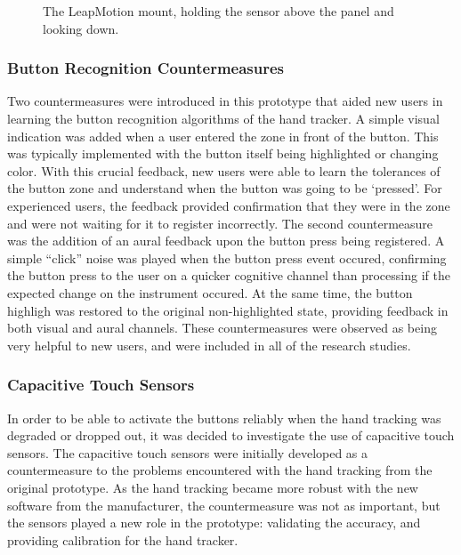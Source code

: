 \begin{figure}
    \centering
    \caption{The LeapMotion mount, holding the sensor above the panel and looking down.}
    \label{fig:proto_leap_mount}
\end{figure}

\subsubsection{Button Recognition Countermeasures}

Two countermeasures were introduced in this prototype that aided new users in learning the button recognition algorithms of the hand tracker.
A simple visual indication was added when a user entered the zone in front of the button.
This was typically implemented with the button itself being highlighted or changing color.
With this crucial feedback, new users were able to learn the tolerances of the button zone and understand when the button was going to be `pressed'.
For experienced users, the feedback provided confirmation that they were in the zone and were not waiting for it to register incorrectly.
The second countermeasure was the addition of an aural feedback upon the button press being registered.
A simple ``click'' noise was played when the button press event occured, confirming the button press to the user on a quicker cognitive channel than processing if the expected change on the instrument occured.
At the same time, the button highligh was restored to the original non-highlighted state, providing feedback in both visual and aural channels.
These countermeasures were observed as being very helpful to new users, and were included in all of the research studies.

\subsubsection{Capacitive Touch Sensors}

In order to be able to activate the buttons reliably when the hand tracking was degraded or dropped out, it was decided to investigate the use of capacitive touch sensors.
The capacitive touch sensors were initially developed as a countermeasure to the problems encountered with the hand tracking from the original prototype.
As the hand tracking became more robust with the new software from the manufacturer, the countermeasure was not as important, but the sensors played a new role in the prototype: validating the accuracy, and providing calibration for the hand tracker.

